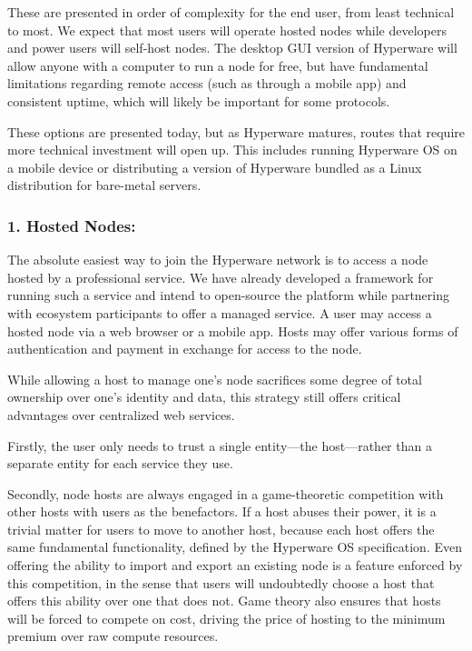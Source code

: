 \documentclass[runningheads]{llncs}
\begin{document}
These are presented in order of complexity for the end user, from least technical to most.
We expect that most users will operate hosted nodes while developers and power users will self-host nodes.
The desktop GUI version of Hyperware will allow anyone with a computer to run a node for free, but have fundamental limitations regarding remote access (such as through a mobile app) and consistent uptime, which will likely be important for some protocols.

These options are presented today, but as Hyperware matures, routes that require more technical investment will open up.
This includes running Hyperware OS on a mobile device or distributing a version of Hyperware bundled as a Linux distribution for bare-metal servers.

\subsubsection{1. Hosted Nodes:}

The absolute easiest way to join the Hyperware network is to access a node hosted by a professional service.
We have already developed a framework for running such a service and intend to open-source the platform while partnering with ecosystem participants to offer a managed service.
A user may access a hosted node via a web browser or a mobile app.
Hosts may offer various forms of authentication and payment in exchange for access to the node.

While allowing a host to manage one's node sacrifices some degree of total ownership over one's identity and data, this strategy still offers critical advantages over centralized web services.

Firstly, the user only needs to trust a single entity—the host—rather than a separate entity for each service they use.

Secondly, node hosts are always engaged in a game-theoretic competition with other hosts with users as the benefactors.
If a host abuses their power, it is a trivial matter for users to move to another host, because each host offers the same fundamental functionality, defined by the Hyperware OS specification.
Even offering the ability to import and export an existing node is a feature enforced by this competition, in the sense that users will undoubtedly choose a host that offers this ability over one that does not.
Game theory also ensures that hosts will be forced to compete on cost, driving the price of hosting to the minimum premium over raw compute resources.
\end{document}
